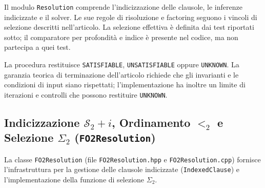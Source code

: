 Il modulo \texttt{Resolution} comprende l'indicizzazione delle clausole, le inferenze indicizzate e il solver. Le sue regole di risoluzione e factoring seguono i vincoli di selezione descritti nell'articolo. La selezione effettiva è definita dai test riportati sotto; il comparatore per profondità e indice è presente nel codice, ma non partecipa a quei test.

La procedura restituisce \texttt{SATISFIABLE}, \texttt{UNSATISFIABLE} oppure \texttt{UNKNOWN}. La garanzia teorica di terminazione dell'articolo richiede che gli invarianti e le condizioni di input siano rispettati; l'implementazione ha inoltre un limite di iterazioni e controlli che possono restituire \texttt{UNKNOWN}.

\subsection{Indicizzazione $\mathcal{S}_2+i$, Ordinamento $<_2$ e Selezione $\Sigma_2$ (\texttt{FO2Resolution})}
\label{subsec:fo2resolution_impl}

La classe \texttt{FO2Resolution} (file \texttt{FO2Resolution.hpp} e \texttt{FO2Resolution.cpp}) fornisce l'infrastruttura per la gestione delle clausole indicizzate (\texttt{IndexedClause}) e l'implementazione della funzione di selezione $\Sigma_2$.

